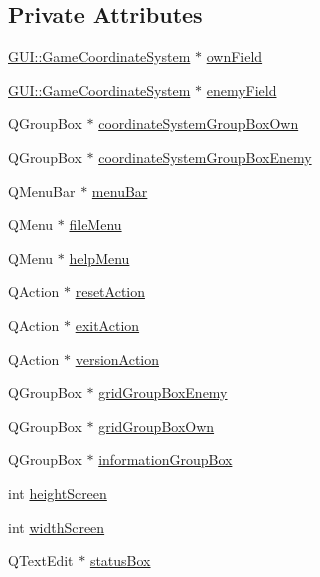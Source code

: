 \subsection*{Private Attributes}
\begin{DoxyCompactItemize}
\item 
\hyperlink{classGUI_1_1GameCoordinateSystem}{G\+U\+I\+::\+Game\+Coordinate\+System} $\ast$ \hyperlink{classGameForm_a3f769801cb22e13a5a878fcdc0518d05}{own\+Field}
\item 
\hyperlink{classGUI_1_1GameCoordinateSystem}{G\+U\+I\+::\+Game\+Coordinate\+System} $\ast$ \hyperlink{classGameForm_a2961c0b23c7112cbc62af053e164b322}{enemy\+Field}
\item 
Q\+Group\+Box $\ast$ \hyperlink{classGameForm_ad18a9191e99822758eb03d5ed5e86e31}{coordinate\+System\+Group\+Box\+Own}
\item 
Q\+Group\+Box $\ast$ \hyperlink{classGameForm_a8bdbfc571a3841ecd4e94c8c79deb480}{coordinate\+System\+Group\+Box\+Enemy}
\item 
Q\+Menu\+Bar $\ast$ \hyperlink{classGameForm_af1e1fab084abbaa2eb09807c6f403a9b}{menu\+Bar}
\item 
Q\+Menu $\ast$ \hyperlink{classGameForm_adb1ab65d1aecac73e58f48557c143b2e}{file\+Menu}
\item 
Q\+Menu $\ast$ \hyperlink{classGameForm_ac589920cc2b87288e454430daa93a976}{help\+Menu}
\item 
Q\+Action $\ast$ \hyperlink{classGameForm_adb8d61a6d4522657760029f301a75497}{reset\+Action}
\item 
Q\+Action $\ast$ \hyperlink{classGameForm_a95088aac220cb7eb4159ab75d86cb81d}{exit\+Action}
\item 
Q\+Action $\ast$ \hyperlink{classGameForm_a4f38a2d30e7f01b923b0d9e3f9f2e048}{version\+Action}
\item 
Q\+Group\+Box $\ast$ \hyperlink{classGameForm_a37c93b300cdcf03835fe5f67b43eb08d}{grid\+Group\+Box\+Enemy}
\item 
Q\+Group\+Box $\ast$ \hyperlink{classGameForm_a39a9c8ff476ae5757052f6691858b0db}{grid\+Group\+Box\+Own}
\item 
Q\+Group\+Box $\ast$ \hyperlink{classGameForm_ab8c97454af833ee8fdc146bcb0f2d8df}{information\+Group\+Box}
\item 
int \hyperlink{classGameForm_aca14d609fbdac3a9b31c709986e66da6}{height\+Screen}
\item 
int \hyperlink{classGameForm_aacecc4646535564c1445645a8161dc5f}{width\+Screen}
\item 
Q\+Text\+Edit $\ast$ \hyperlink{classGameForm_acbe8a9ebdd294a5a7a2f0ba567a3d4cf}{status\+Box}

\end{DoxyCompactItemize}
